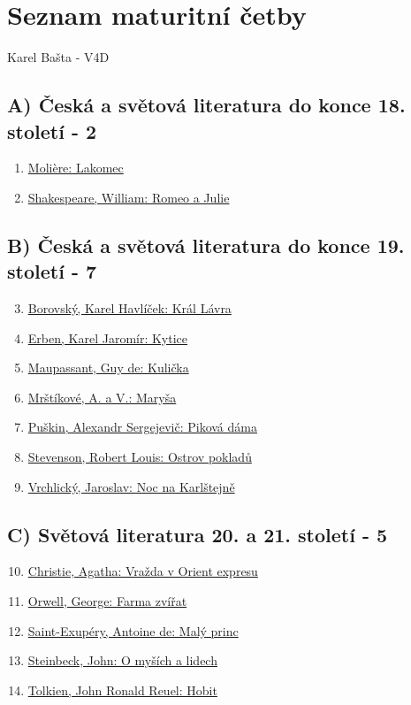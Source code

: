 \documentclass[a4paper,11pt]{article}
\begin{document}

\section*{Seznam maturitní četby}
\begin{center}
  \Large Karel Bašta - V4D
\end{center}
\subsection*{A)	Česká a světová literatura do konce 18. století - 2}
\begin{enumerate}
  \item \hyperref[sec:lakomec]{Molière: Lakomec}
  \item \hyperref[sec:romeoajulie]{Shakespeare, William: Romeo a Julie}
\end{enumerate}
\subsection*{B)	Česká a světová literatura do konce 19. století - 7}
\begin{enumerate}
  \setcounter{enumi}{2}
  \item \hyperref[sec:krallavra]{Borovský, Karel Havlíček: Král Lávra}
  \item \hyperref[sec:kytice]{Erben, Karel Jaromír: Kytice}
  \item \hyperref[sec:kulicka]{Maupassant, Guy de: Kulička}
  \item \hyperref[sec:marysa]{Mrštíkové, A. a V.: Maryša}
  \item \hyperref[sec:pikovadama]{Puškin, Alexandr Sergejevič: Piková dáma}
  \item \hyperref[sec:ostrovpokladu]{Stevenson, Robert Louis: Ostrov pokladů}
  \item \hyperref[sec:nocnakarlstejne]{Vrchlický, Jaroslav: Noc na Karlštejně}
\end{enumerate}
\subsection*{C)	Světová literatura 20. a 21. století - 5}
\begin{enumerate}
  \setcounter{enumi}{9}
  \item \hyperref[sec:orientexpres]{Christie, Agatha: Vražda v Orient expresu}
  \item \hyperref[sec:farmazvirat]{Orwell, George: Farma zvířat}
  \item \hyperref[sec:malyprinc]{Saint-Exupéry, Antoine de: Malý princ}
  \item \hyperref[sec:omysichalidech]{Steinbeck, John: O myších a lidech}
  \item \hyperref[sec:hobit]{Tolkien, John Ronald Reuel: Hobit}
\end{enumerate}
\end{document}
